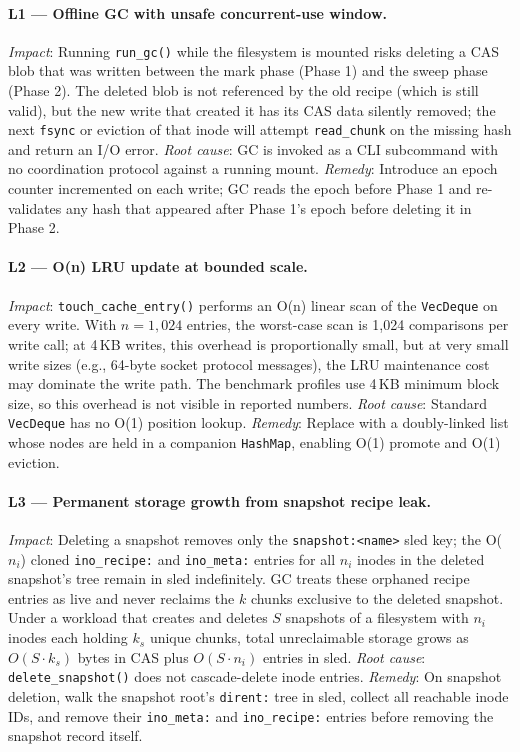 \documentclass[5p,times]{elsarticle}
\begin{document}
\paragraph{L1 --- Offline GC with unsafe concurrent-use window.}
\textit{Impact}: Running \texttt{run\_gc()} while the filesystem is
mounted risks deleting a CAS blob that was written between the mark phase
(Phase 1) and the sweep phase (Phase 2).  The deleted blob is not
referenced by the old recipe (which is still valid), but the new write
that created it has its CAS data silently removed; the next
\texttt{fsync} or eviction of that inode will attempt \texttt{read\_chunk}
on the missing hash and return an I/O error.  \textit{Root cause}: GC
is invoked as a CLI subcommand with no coordination protocol against
a running mount. \textit{Remedy}: Introduce an epoch counter incremented
on each write; GC reads the epoch before Phase 1 and re-validates any
hash that appeared after Phase 1's epoch before deleting it in Phase 2.

\paragraph{L2 --- O(n) LRU update at bounded scale.}
\textit{Impact}: \texttt{touch\_cache\_entry()} performs an O(n) linear
scan of the \texttt{VecDeque} on every write.  With $n = 1{,}024$ entries,
the worst-case scan is 1,024 comparisons per write call; at 4\,KB writes,
this overhead is proportionally small, but at very small write sizes
(e.g., 64-byte socket protocol messages), the LRU maintenance cost
may dominate the write path.  The benchmark profiles use 4\,KB minimum
block size, so this overhead is not visible in reported numbers.
\textit{Root cause}: Standard \texttt{VecDeque} has no O(1) position
lookup. \textit{Remedy}: Replace with a doubly-linked list whose nodes
are held in a companion \texttt{HashMap}, enabling O(1) promote and
O(1) eviction.

\paragraph{L3 --- Permanent storage growth from snapshot recipe leak.}
\textit{Impact}: Deleting a snapshot removes only the
\texttt{snapshot:\textless{}name\textgreater{}} sled key; the O($n_i$)
cloned \texttt{ino\_recipe:} and \texttt{ino\_meta:} entries for all
$n_i$ inodes in the deleted snapshot's tree remain in sled
indefinitely.  GC treats these orphaned recipe entries as live and
never reclaims the $k$ chunks exclusive to the deleted snapshot.  Under
a workload that creates and deletes $S$ snapshots of a filesystem with
$n_i$ inodes each holding $k_s$ unique chunks, total unreclaimable
storage grows as $O(S \cdot k_s)$ bytes in CAS plus $O(S \cdot n_i)$
entries in sled.  \textit{Root cause}: \texttt{delete\_snapshot()} does
not cascade-delete inode entries.  \textit{Remedy}: On snapshot deletion,
walk the snapshot root's \texttt{dirent:} tree in sled, collect all
reachable inode IDs, and remove their \texttt{ino\_meta:} and
\texttt{ino\_recipe:} entries before removing the snapshot record itself.
\end{document}
